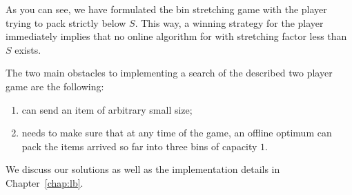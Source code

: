 As you can see, we have formulated the bin stretching game with the
player \algo trying to pack strictly below $S$. This way, a winning
strategy for the player \adversary immediately implies that no online
algorithm for \binstretch with stretching factor less than $S$ exists.

The two main obstacles to implementing a search of the described two player
game are the following:

\begin{enumerate}
\item \adversary can send an item of arbitrary small size;
\item \adversary needs to make sure that at any time of the game, an offline
  optimum can pack the items arrived so far into three bins of capacity $1$.
\end{enumerate}

We discuss our solutions as well as the implementation details in Chapter~\ref{chap:lb}.